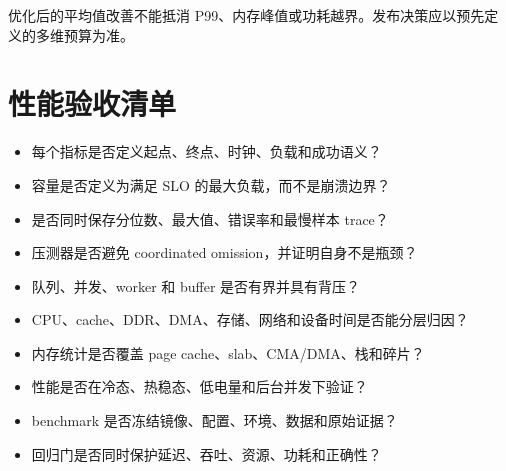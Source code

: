 优化后的平均值改善不能抵消 P99、内存峰值或功耗越界。发布决策应以预先定义的多维预算为准。

\section{性能验收清单}

\begin{itemize}
  \item 每个指标是否定义起点、终点、时钟、负载和成功语义？
  \item 容量是否定义为满足 SLO 的最大负载，而不是崩溃边界？
  \item 是否同时保存分位数、最大值、错误率和最慢样本 trace？
  \item 压测器是否避免 coordinated omission，并证明自身不是瓶颈？
  \item 队列、并发、worker 和 buffer 是否有界并具有背压？
  \item CPU、cache、DDR、DMA、存储、网络和设备时间是否能分层归因？
  \item 内存统计是否覆盖 page cache、slab、CMA/DMA、栈和碎片？
  \item 性能是否在冷态、热稳态、低电量和后台并发下验证？
  \item benchmark 是否冻结镜像、配置、环境、数据和原始证据？
  \item 回归门是否同时保护延迟、吞吐、资源、功耗和正确性？
\end{itemize}
